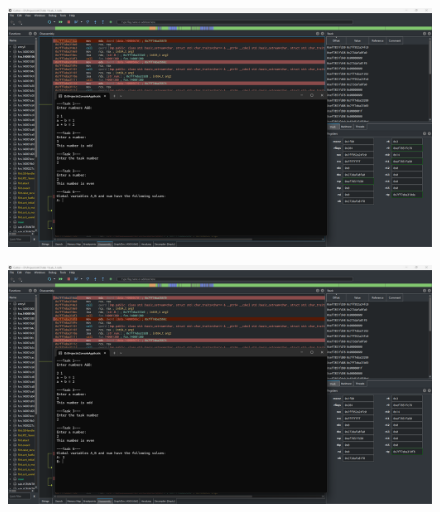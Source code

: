 \documentclass[a4paper,12pt]{article}
\begin{document}
\newpage
    \begin{figure}[h!]
        \begin{minipage}[h]{1\linewidth}
            \centering
            \includegraphics[width=1\linewidth]{Prt sc/4_1.png}  
        \end{minipage}
    \end{figure}
    \begin{figure}[h!]
        \begin{minipage}[h]{1\linewidth}
            \centering
            \includegraphics[width=1\linewidth]{Prt sc/4_2.png}  
        \end{minipage}
    \end{figure}
\end{document}
